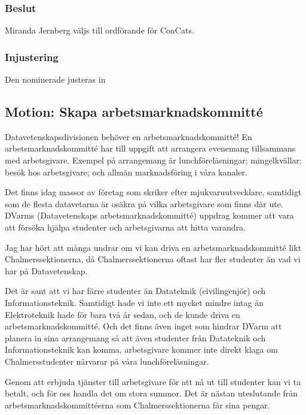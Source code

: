 \documentclass[protokoll]{dvd}
\begin{document}
        \subsubsection*{Beslut}
            \begin{attsatser}
                \item Miranda Jernberg väljs till ordförande för ConCats.
            \end{attsatser}

        \subsubsection*{Injustering}
        Den nominerade justeras in


\newpage

\subsection{Motion: Skapa arbetsmarknadskommitté}

Datavetenskapsdivisionen behöver en arbetsmarknadskommitté! En arbetsmarknadskommitté har till uppgift att arrangera evenemang tillsammans med arbetsgivare. Exempel på arrangemang är lunchföreläsningar; mingelkvällar; besök hos arbetsgivare; och allmän marknadsföring i våra kanaler.

Det finns idag massor av företag som skriker efter mjukvaruutvecklare, samtidigt som de flesta datavetarna är osäkra på vilka arbetsgivare som finns där ute. DVarms (Datavetenskaps arbetsmarknadskommitté) uppdrag kommer att vara att försöka hjälpa studenter och arbetsgivarna att hitta varandra.

Jag har hört att många undrar om vi kan driva en arbetsmarknadskommitté likt Chalmerssektionerna, då Chalmerssektionerna oftast har fler studenter än vad vi har på Datavetenskap.

Det är sant att vi har färre studenter än Datateknik (civilingenjör) och Informationsteknik. Samtidigt hade vi inte ett mycket mindre intag än Elektroteknik hade för bara två år sedan, och de kunde driva en arbetsmarknadskommitté. Och det finns även inget som hindrar DVarm att planera in sina arrangemang så att även studenter från Datateknik och Informationsteknik kan komma, arbetsgivare kommer inte direkt klaga om Chalmersstudenter närvarar på våra lunchföreläsningar.

Genom att erbjuda tjänster till arbetsgivare för att nå ut till studenter kan vi ta betalt, och för oss handla det om stora summor. Det är nästan uteslutande från arbetsmarknadskommittéerna som Chalmerssektionerna får sina pengar.
\end{document}
